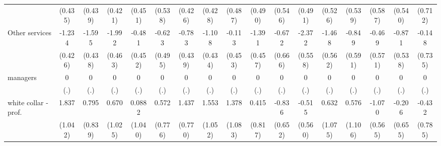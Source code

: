 {\begin{tabular}{l*{16}{c}}
                    &     (0.435)         &     (0.439)         &     (0.421)         &     (0.451)         &     (0.538)         &     (0.426)         &     (0.428)         &     (0.487)         &     (0.490)         &     (0.546)         &     (0.491)         &     (0.526)         &     (0.539)         &     (0.587)         &     (0.540)         &     (0.712)         \\
[1em]
Other services      &      -1.234\sym{**} &      -1.595\sym{***}&      -1.992\sym{***}&      -0.481         &      -0.623         &      -0.783         &      -1.108\sym{*}  &      -0.113         &      -1.391\sym{**} &      -0.672         &      -2.372\sym{***}&      -1.468\sym{**} &      -0.849         &      -0.469         &      -0.871         &      -0.148         \\
                    &     (0.426)         &     (0.438)         &     (0.463)         &     (0.452)         &     (0.495)         &     (0.439)         &     (0.434)         &     (0.453)         &     (0.457)         &     (0.666)         &     (0.558)         &     (0.562)         &     (0.591)         &     (0.571)         &     (0.538)         &     (0.735)         \\
[1em]
managers            &           0         &           0         &           0         &           0         &           0         &           0         &           0         &           0         &           0         &           0         &           0         &           0         &           0         &           0         &           0         &           0         \\
                    &         (.)         &         (.)         &         (.)         &         (.)         &         (.)         &         (.)         &         (.)         &         (.)         &         (.)         &         (.)         &         (.)         &         (.)         &         (.)         &         (.)         &         (.)         &         (.)         \\
[1em]
white collar - prof.&       1.837         &       0.795         &       0.670         &      0.0882         &       0.572         &       1.437         &       1.553         &       1.378         &       0.415         &      -0.836         &      -0.515         &       0.632         &       0.576         &      -1.070         &      -0.206         &      -0.432         \\
                    &     (1.042)         &     (0.839)         &     (1.025)         &     (1.040)         &     (0.776)         &     (0.770)         &     (1.052)         &     (1.083)         &     (0.817)         &     (0.652)         &     (0.560)         &     (1.075)         &     (1.106)         &     (0.565)         &     (0.655)         &     (0.785)         \\

\end{tabular}}
